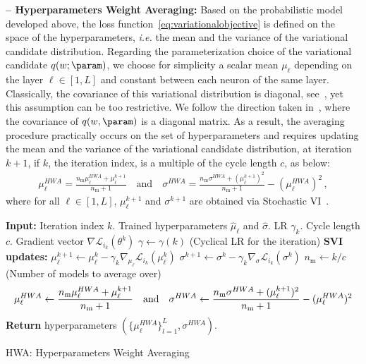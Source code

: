 \documentclass[tablecaption=bottom,wcp]{jmlr}
\begin{document}
\textbf{-- Hyperparameters Weight Averaging:}
Based on the probabilistic model developed above, the loss function~\eqref{eq:variationalobjective} is defined on the space of the hyperparameters, \textit{i.e.} the mean and the variance of the variational candidate distribution.
Regarding the parameterization choice of the variational candidate $q( w; \param )$, we choose for simplicity a scalar mean $\mu_{\ell}$ depending on the layer $\ell \in [1,L]$ and constant between each neuron of the same layer. 
Classically, the covariance of this variational distribution is diagonal, see~\citep{kirkpatrick2017overcoming, blundell2015weight}, yet this assumption can be too restrictive.
We follow the direction taken in~\citep{maddox2019simple}, where the covariance of $q(w, \param)$ is a diagonal matrix.
As a result, the averaging procedure practically occurs on the set of hyperparameters and requires updating the mean and the variance of the variational candidate distribution, at iteration $k+1$, if $k$, the iteration index, is a multiple of the cycle length $c$,  as below:
\begin{equation}\label{eq:hwa_updates}
\begin{split}
 \mu_{\ell}^{HWA}  =  \frac{n_{\textrm{m}}\mu_{\ell}^{HWA} + \mu_{\ell}^{k+1}}{n_{\textrm{m}}+1}  \quad \textrm{and} \quad  \sigma^{HWA}   =  \frac{n_{\textrm{m}}\sigma^{HWA} + (\mu_{\ell}^{k+1})^2}{n_{\textrm{m}}+1} -( \mu_{\ell}^{HWA})^2 \, ,
\end{split}
\end{equation}
where for all $\ell \in [1,L]$, $\mu_{\ell}^{k+1}$ and $\sigma^{k+1}$ are obtained via Stochastic VI~\citep{hoffman2013stochastic}.


\begin{algorithm}[H]
\begin{algorithmic}[1]
\STATE \textbf{Input:} Iteration index $k$. Trained hyperparameters $\hat{\mu}_{\ell}$ and $\hat{\sigma}$. LR $\gamma_k$. Cycle length $c$. Gradient vector $\nabla \mathcal{L}_{i_{k}}(\theta^{k})$
\STATE $\gamma \leftarrow \gamma(k)$ (Cyclical LR for the iteration)
\STATE \textbf{SVI updates:}
\STATE \quad $\mu_{\ell}^{k+1} \leftarrow \mu_{\ell}^{k} - \gamma_k \nabla_{\mu_{\ell}} \mathcal{L}_{i_{k}}(\mu_{\ell}^{k})$  \label{line:svi}
\STATE \quad $\sigma^{k+1} \leftarrow \sigma^{k} - \gamma_k \nabla_{\sigma} \mathcal{L}_{i_{k}}(\sigma^{k})$ \label{line:svisigma}
	\STATE \quad $n_{\textrm{m}} \leftarrow k/c$ \quad (Number of models to average over)
\begin{equation}\notag
\mu_{\ell}^{HWA} \leftarrow \frac{n_{\textrm{m}}\mu_{\ell}^{HWA} + \mu_{\ell}^{k+1}}{n_{\textrm{m}}+1} \quad \textrm{and} \quad \sigma^{HWA} \leftarrow \frac{n_{\textrm{m}}\sigma^{HWA} + (\mu_{\ell}^{k+1})^2}{n_{\textrm{m}}+1} -( \mu_{\ell}^{HWA})^2
\end{equation}
\ENDIF
\STATE \textbf{Return} hyperparameters $(\{\mu_{\ell}^{HWA}\}_{l=1}^L, \sigma^{HWA})$.
\end{algorithmic}
\caption{HWA: Hyperparameters Weight Averaging}
\label{alg:hwa}
\end{algorithm}
\end{document}
